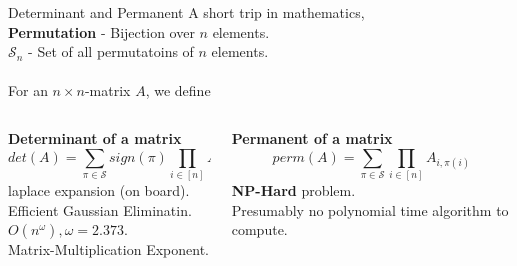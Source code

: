 \begin{frame}[t]{Determinant and Permanent}
	A short trip in mathematics,\\
	\textbf{Permutation} - Bijection over $n$ elements.\\
	$\mathcal{S}_n$ - Set of all permutatoins of $n$ elements.\\~\\
	For an $n\times n$-matrix $A$, we define

\begin{columns}[T] %
\begin{column}{.48\textwidth}
	{\centering \textbf{Determinant of a matrix}\\}
$$det(A) =  \sum\limits_{\pi \in \mathcal{S}} sign(\pi) \prod\limits_{i\in[n]} A_{i, \pi(i)}$$
	laplace expansion (on board).\\
	Efficient Gaussian Eliminatin.\\
	$O(n^\omega), \omega = 2.373$.\\
	Matrix-Multiplication Exponent.\\

\end{column}
\hfill%
\begin{column}{.48\textwidth}
	{\centering \textbf{Permanent of a matrix}\\}
$$perm(A) =  \sum\limits_{\pi \in \mathcal{S}}  \prod\limits_{i\in[n]} A_{i, \pi(i)}$$
	\textbf{NP-Hard} problem.\\
	Presumably no polynomial time algorithm to compute.\\

\end{column}
\end{columns}
\end{frame}

